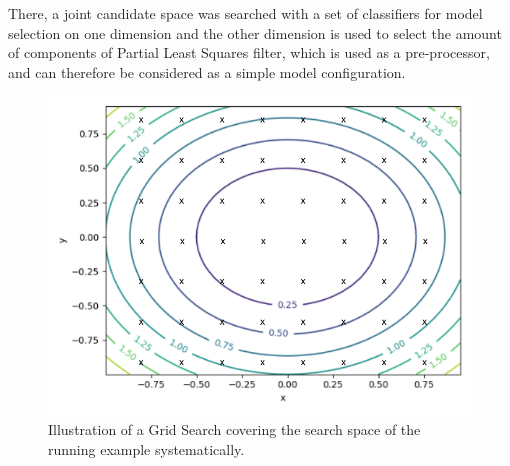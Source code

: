 There, a joint candidate space was searched with a set of classifiers for model selection on one dimension and the other dimension is used to select the amount of components of Partial Least Squares filter, which is used as a pre-processor, and can therefore be considered as a simple model configuration.
\begin{figure}[ht!]
    \centering
    \includegraphics[width=\textwidth]{gfx/Figures/Theory/GridSearch.pdf}
    \caption{Illustration of a Grid Search covering the search space of the running example systematically.}
    \label{fig:theory:grid-search}
\end{figure}

